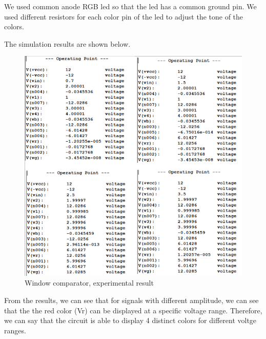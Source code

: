 \documentclass[conference]{IEEEtran}
\begin{document}
\par We used common anode RGB led so that the led has a common ground pin. We used different resistors for each color pin of the led 
to adjust the tone of the colors. 

\par The simulation results are shown below.
\begin{figure}[H]
    \centerline{\includegraphics[scale=0.4]{wcr.png}}
     \caption{Window comparator, experimental result}
 \end{figure} 
\par From the results, we can see that for signals with different amplitude, we can see that the the red color (Vr) can be displayed at 
a specific voltage range. Therefore, we can say that the circuit is able to display 4 distinct colors for different voltge ranges. 
\end{document}
